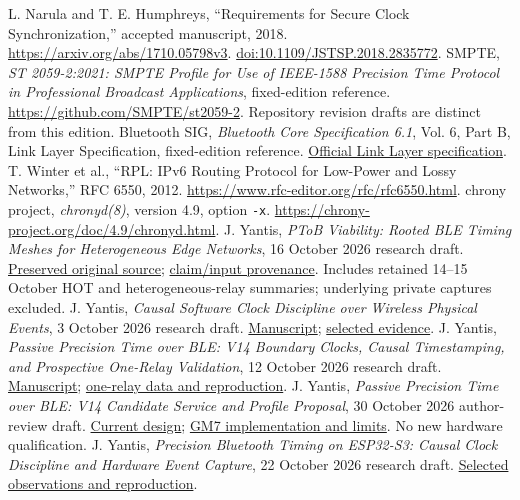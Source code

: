 \documentclass[11pt,letterpaper]{article}
\newcommand{\repo}[2]{\href{https://github.com/yantisj2/PToB/blob/a3c96db35b1817de534abe4450cfd032ceca77e8/#1}{#2}}
\begin{document}
\begin{thebibliography}{99}
 L. Narula and T. E. Humphreys, ``Requirements for Secure Clock Synchronization,'' accepted manuscript, 2018. \url{https://arxiv.org/abs/1710.05798v3}. \href{https://doi.org/10.1109/JSTSP.2018.2835772}{doi:10.1109/JSTSP.2018.2835772}.
 SMPTE, \emph{ST 2059-2:2021: SMPTE Profile for Use of IEEE-1588 Precision Time Protocol in Professional Broadcast Applications}, fixed-edition reference. \url{https://github.com/SMPTE/st2059-2}. Repository revision drafts are distinct from this edition.
 Bluetooth SIG, \emph{Bluetooth Core Specification 6.1}, Vol. 6, Part B, Link Layer Specification, fixed-edition reference. \href{https://www.bluetooth.com/wp-content/uploads/Files/Specification/HTML/Core-61/out/en/low-energy-controller/link-layer-specification.html}{Official Link Layer specification}.
 T. Winter et al., ``RPL: IPv6 Routing Protocol for Low-Power and Lossy Networks,'' RFC 6550, 2012. \url{https://www.rfc-editor.org/rfc/rfc6550.html}.
 chrony project, \emph{chronyd(8)}, version 4.9, option \texttt{-x}. \url{https://chrony-project.org/doc/4.9/chronyd.html}.
 J. Yantis, \emph{PToB Viability: Rooted BLE Timing Meshes for Heterogeneous Edge Networks}, 16 October 2026 research draft. \repo{papers/ptob-viability-preprint.tex}{Preserved original source}; \repo{evidence/research/2026-10-16/provenance/ptob-viability-evidence-20261016.json}{claim/input provenance}. Includes retained 14--15 October HOT and heterogeneous-relay summaries; underlying private captures excluded.
 J. Yantis, \emph{Causal Software Clock Discipline over Wireless Physical Events}, 3 October 2026 research draft. \repo{papers/oscillator-pll-research-20261003.tex}{Manuscript}; \repo{evidence/papers/oscillator-pll-2026-10-03/README.md}{selected evidence}.
 J. Yantis, \emph{Passive Precision Time over BLE: V14 Boundary Clocks, Causal Timestamping, and Prospective One-Relay Validation}, 12 October 2026 research draft. \repo{papers/ptob-v14-preprint.tex}{Manuscript}; \repo{evidence/v14/2026-10-12/README.md}{one-relay data and reproduction}.
 J. Yantis, \emph{Passive Precision Time over BLE: V14 Candidate Service and Profile Proposal}, 30 October 2026 author-review draft. \repo{papers/ptob-v14-sig-proposal.tex}{Current design}; \repo{docs/t096/gm7-implementation.md}{GM7 implementation and limits}. No new hardware qualification.
 J. Yantis, \emph{Precision Bluetooth Timing on ESP32-S3: Causal Clock Discipline and Hardware Event Capture}, 22 October 2026 research draft. \repo{evidence/s3/2026-10-22-fine/README.md}{Selected observations and reproduction}.

\end{thebibliography}
\end{document}
